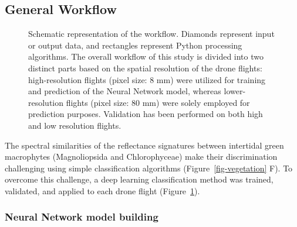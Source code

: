 \documentclass[
  number]{elsarticle}
\begin{document}
\subsection{General Workflow}\label{general-workflow}

\label{cell-fig-workflow}
\begin{figure}[H]


\caption{\label{fig-workflow}Schematic representation of the workflow.
Diamonds represent input or output data, and rectangles represent Python
processing algorithms. The overall workflow of this study is divided
into two distinct parts based on the spatial resolution of the drone
flights: high-resolution flights (pixel size: 8 mm) were utilized for
training and prediction of the Neural Network model, whereas
lower-resolution flights (pixel size: 80 mm) were solely employed for
prediction purposes. Validation has been performed on both high and low
resolution flights.}

\end{figure}%

The spectral similarities of the reflectance signatures between
intertidal green macrophytes (Magnoliopsida and Chlorophyceae) make
their discrimination challenging using simple classification algorithms
(Figure~\ref{fig-vegetation} F). To overcome this challenge, a deep
learning classification method was trained, validated, and applied to
each drone flight (Figure~\ref{fig-workflow}).

\subsubsection{Neural Network model
building}\label{neural-network-model-building}
\end{document}
